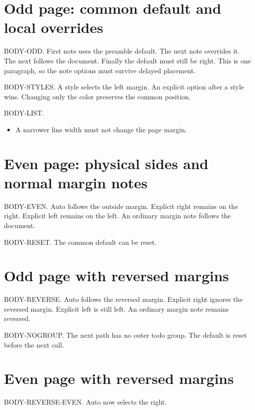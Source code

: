 \documentclass[twoside]{article}
\begin{document}
\section*{Odd page: common default and local overrides}
BODY-ODD. First note uses the preamble default.
The next note overrides it.
The next follows the document.
Finally the default must still be right.
This is one paragraph, so the note options must survive delayed placement.
\par\vspace{4cm}
BODY-STYLES. A style selects the left margin.
An explicit option after a style wins.
Changing only the color preserves the common position.
\par\vspace{4cm}
BODY-LIST.
\begin{itemize}
\item A narrower line width must not change the page margin.
\end{itemize}
\newpage
\section*{Even page: physical sides and normal margin notes}
BODY-EVEN. Auto follows the outside margin.
Explicit right remains on the right.
Explicit left remains on the left.
An ordinary margin note follows the document.
\par\vspace{5cm}
BODY-RESET. The common default can be reset.
\newpage
\reversemarginpar
\section*{Odd page with reversed margins}
BODY-REVERSE. Auto follows the reversed margin.
Explicit right ignores the reversed margin.
Explicit left is still left.
An ordinary margin note remains reversed.
\par\vspace{5cm}
BODY-NOGROUP. The next path has no outer todo group.
The default is reset before the next call.
\newpage
\section*{Even page with reversed margins}
BODY-REVERSE-EVEN. Auto now selects the right.
\end{document}
